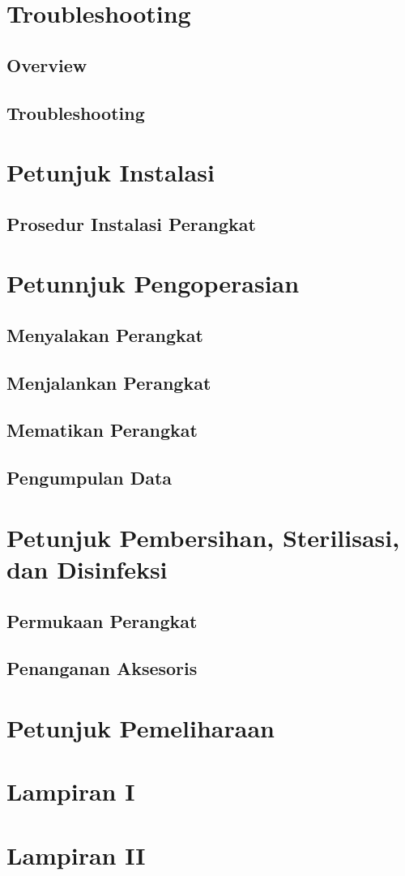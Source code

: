 \documentclass[11pt,a4paper,twoside,draft,onecolumn]{book}
\begin{document}
	\chapter{Troubleshooting}
	\section{Overview}
	\section{Troubleshooting}
	\newpage
	
	\chapter{Petunjuk Instalasi}
	\section{Prosedur Instalasi Perangkat}
	\newpage
	
	\chapter{Petunnjuk Pengoperasian}
	\section{Menyalakan Perangkat}
	\section{Menjalankan Perangkat}
	\section{Mematikan Perangkat}
	\section{Pengumpulan Data}
	\newpage
	
	\chapter{Petunjuk Pembersihan, Sterilisasi, dan Disinfeksi}
	\section{Permukaan Perangkat}
	\section{Penanganan Aksesoris}
	\newpage
	
	\chapter{Petunjuk Pemeliharaan}
	\newpage
	
	\chapter*{Lampiran I}
	\newpage
	
	\chapter*{Lampiran II}
	\newpage
	
	
\end{document}
